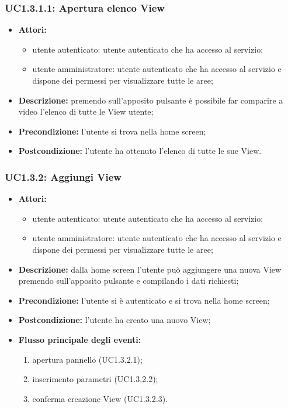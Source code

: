 \subsubsection{UC1.3.1.1: Apertura elenco View}

\begin{itemize}
    \item \textbf{Attori:}
    \begin{itemize}
    	\item utente autenticato: utente autenticato che ha accesso al servizio;
    	\item utente amministratore: utente autenticato che ha accesso al servizio e dispone dei permessi per visualizzare tutte le aree;
	\end{itemize}
    \item \textbf{Descrizione:} premendo sull'apposito pulsante è possibile far comparire a video l'elenco di tutte le View utente;
    \item \textbf{Precondizione:} l'utente si trova nella home screen;
    \item \textbf{Postcondizione:} l'utente ha ottenuto l'elenco di tutte le sue View.
\end{itemize}

\subsubsection{UC1.3.2: Aggiungi View}

\begin{itemize}
    \item \textbf{Attori:}
    \begin{itemize}
    	\item utente autenticato: utente autenticato che ha accesso al servizio;
    	\item utente amministratore: utente autenticato che ha accesso al servizio e dispone dei permessi per visualizzare tutte le aree;
	\end{itemize}
    \item \textbf{Descrizione:} dalla home screen l'utente può aggiungere una nuova View premendo sull'apposito pulsante e compilando i dati richiesti;
    \item \textbf{Precondizione:} l'utente si è autenticato e si trova nella home screen;
    \item \textbf{Postcondizione:} l'utente ha creato una nuovo View;
	\item \textbf{Flusso principale degli eventi:}
    \begin{enumerate}
        \item apertura pannello (UC1.3.2.1);
        \item inserimento parametri (UC1.3.2.2);
        \item conferma creazione View (UC1.3.2.3).
    \end{enumerate}
\end{itemize}

